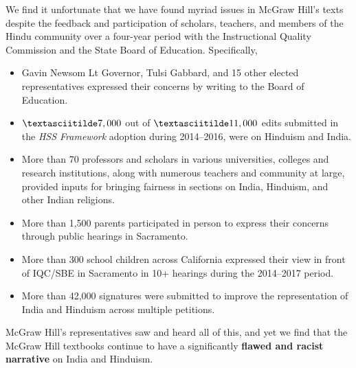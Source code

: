 We find it unfortunate that we have found myriad issues in McGraw Hill’s texts despite the feedback and participation of scholars, teachers, and members of the Hindu community over a four-year period with the Instructional Quality Commission and the State Board of Education. Specifically, 
\begin{itemize} 
\item Gavin Newsom Lt Governor, Tulsi Gabbard, and 15 other elected representatives expressed their concerns by writing to the Board of Education.
\item $\textasciitilde 7,000$ out of $\textasciitilde 11,000$ edits submitted in the \textit{HSS Framework} adoption during 2014--2016, were on Hinduism and India.
\item More than 70 professors and scholars in various universities, colleges and research institutions, along with numerous teachers and community at large, provided inputs for bringing fairness in sections on India, Hinduism, and other Indian religions.
\item More than 1,500 parents participated in person to express their concerns through public hearings in Sacramento.
\item More than 300 school children across California expressed their view in front of IQC/SBE in Sacramento in 10+ hearings during the 2014--2017 period.
\item More than 42,000 signatures were submitted to improve the representation of India and Hinduism across multiple petitions.
\end{itemize}
McGraw Hill’s representatives saw and heard all of this, and yet we find that the McGraw Hill textbooks continue to have a significantly \textbf{flawed and racist narrative} on India and Hinduism.

